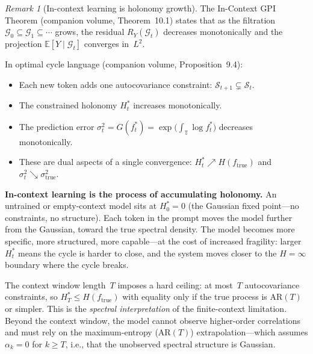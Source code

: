 \documentclass[11pt,a4paper]{article}
\theoremstyle{definition}
\theoremstyle{remark}
\newtheorem{remark}[theorem]{Remark}
\begin{document}
\begin{remark}[In-context learning is holonomy growth]
\label{rmk:icl-holonomy}
The In-Context GPI Theorem (companion volume, Theorem~10.1)
states that as the filtration
$\mathcal{G}_0 \subseteq \mathcal{G}_1 \subseteq \cdots$ grows,
the residual $R_Y(\mathcal{G}_t)$ decreases monotonically and
the projection $\mathbb{E}[Y \mid \mathcal{G}_t]$ converges
in~$L^2$.

In optimal cycle language (companion volume, Proposition~9.4):
\begin{itemize}[nosep]
\item Each new token adds one autocovariance constraint:
  $\mathcal{S}_{t+1} \subsetneq \mathcal{S}_t$.
\item The constrained holonomy $H_t^*$ increases monotonically.
\item The prediction error
  $\sigma_t^2 = G(f_t^*) = \exp\!\bigl(\int_{\mathbb{T}}
  \!\log f_t^*\bigr)$
  decreases monotonically.
\item These are dual aspects of a single convergence:
  $H_t^* \nearrow H(f_{\mathrm{true}})$ and
  $\sigma_t^2 \searrow \sigma_{\mathrm{true}}^2$.
\end{itemize}

\textbf{In-context learning is the process of accumulating
holonomy.}
An untrained or empty-context model sits at $H_0^* = 0$
(the Gaussian fixed point---no constraints, no structure).
Each token in the prompt moves the model further from the
Gaussian, toward the true spectral density.
The model becomes more specific, more structured, more
capable---at the cost of increased fragility: larger~$H_t^*$
means the cycle is harder to close, and the system moves
closer to the $H = \infty$ boundary where the cycle breaks.

The context window length~$T$ imposes a hard ceiling: at
most~$T$ autocovariance constraints, so
$H_T^* \leq H(f_{\mathrm{true}})$ with equality only if the
true process is AR$(T)$ or simpler.
This is the \emph{spectral interpretation} of the
finite-context limitation.
Beyond the context window, the model cannot observe higher-order
correlations and must rely on the maximum-entropy (AR$(T)$)
extrapolation---which assumes $\alpha_k = 0$ for $k \geq T$,
i.e., that the unobserved spectral structure is Gaussian.


\end{remark}
\end{document}
